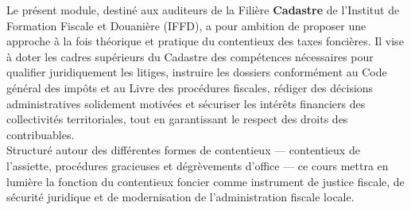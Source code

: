 \documentclass[Cours_contentieuxTF2026.tex]{subfiles}
\begin{document}
\noindent Le présent module, destiné aux auditeurs de la Filière  \textbf{Cadastre} de l’Institut de Formation 
Fiscale et Douanière (IFFD), a pour ambition de proposer une approche à la fois théorique et 
pratique du contentieux des taxes foncières. Il vise à doter les cadres supérieurs du Cadastre des 
compétences nécessaires pour qualifier juridiquement les litiges, instruire les dossiers conformément 
au Code général des impôts et au Livre des procédures fiscales, rédiger des décisions administratives 
solidement motivées et sécuriser les intérêts financiers des collectivités territoriales, tout en 
garantissant le respect des droits des contribuables.\\

\noindent Structuré autour des différentes formes de contentieux --- contentieux de l’assiette,
 procédures gracieuses et dégrèvements d’office --- ce cours mettra en lumière la 
fonction du contentieux foncier comme instrument de justice fiscale, de sécurité juridique et de 
modernisation de l’administration fiscale locale.
\end{document}
